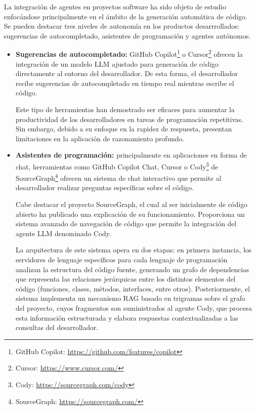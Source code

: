 La integración de agentes en proyectos software ha sido objeto de estudio enfocándose principalmente en el ámbito de la generación automática de código. Se pueden destacar tres niveles de autonomía en los productos desarrrollados: sugerencias de autocompletado, asistentes de programación y agentes autónomos. 

\begin{itemize}
  \item {\textbf{Sugerencias de autocompletado:}} GitHub Copilot\footnote{GitHub Copilot: \url{https://github.com/features/copilot}} o Cursor\footnote{Cursor: \url{https://www.cursor.com/}} ofrecen la integración de un modelo LLM ajustado para generación de código directamente al entorno del desarrollador. De esta forma, el desarrollador recibe sugerencias de autocompletado en tiempo real mientras escribe el código.  

Este tipo de herramientas han demostrado ser eficaces para aumentar la productividad de los desarrolladores en tareas de programación repetitivas\cite{kalliamvakou_research_2022}. Sin embargo, debido a su enfoque en la rapidez de respuesta, presentan limitaciones en la aplicación de razonamiento profundo.

\item {\textbf{Asistentes de programación:}} principalmente en aplicaciones en forma de chat, herramientas como GitHub Copilot Chat, Cursor o Cody\footnote{Cody: \url{https://sourcegraph.com/cody}} de SourceGraph\footnote{SourceGraph: \url{https://sourcegraph.com/}} ofrecen un sistema de chat interactivo que permite al desarrollador realizar preguntas específicas sobre el código\cite{noauthor_github_nodate}.
  
Cabe destacar el proyecto SourceGraph, el cual al ser inicialmente de código abierto ha publicado una explicación de su funcionamiento. Proporciona un sistema avanzado de navegación de código que permite la integración del agente LLM denominado Cody.

La arquitectura de este sistema opera en dos etapas: en primera instancia, los servidores de lenguaje específicos para cada lenguaje de programación analizan la estructura del código fuente, generando un grafo de dependencias que representa las relaciones jerárquicas entre los distintos elementos del código (funciones, clases, métodos, interfaces, entre otros)\cite{noauthor_sourcegraphscip_2025}. Posteriormente, el sistema implementa un mecanismo RAG basado en trigramas sobre el grafo del proyecto, cuyos fragmentos son suministrados al agente Cody, que procesa esta información estructurada y elabora respuestas contextualizadas a las consultas del desarrollador\cite{noauthor_sourcegraphsourcegraph-public-snapshot_nodate}.


\end{itemize}
